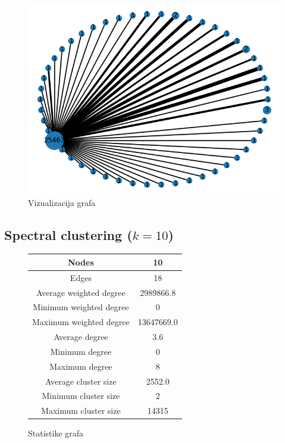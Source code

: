 \documentclass[a4paper,12pt]{article}
\begin{document}
	\begin{figure}[H]
		\centering
		\includegraphics[scale=0.7]{spanning_merged_graph_50_visualization}
		\caption{Vizualizacija grafa}
	\end{figure}


	\subsection{Spectral clustering ($k = 10$)}
	\begin{figure}[H]
		\centering
		\begin{tabular}{ |c|c| } 
			\hline
			Nodes& 10 \\
			\hline
			Edges& 18 \\
			\hline
			Average weighted degree& 2989866.8 \\
			Minimum weighted degree& 0  \\
			Maximum weighted degree& 13647669.0 \\
			\hline
			Average degree& 3.6 \\
			Minimum degree& 0 \\ 
			Maximum degree& 8 \\
			\hline
			Average cluster size& 2552.0 \\
			Minimum cluster size& 2 \\
			Maximum cluster size& 14315 \\
			\hline
			
		\end{tabular}
		\caption{Statistike grafa}
	\end{figure}
	
\end{document}
